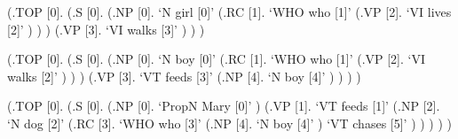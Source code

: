 \documentclass[10pt]{article}
\begin{document}
\begin{parsetree}  (.TOP [0]. (.S [0]. (.NP [0]. `N girl  [0]' (.RC [1]. `WHO who  [1]' (.VP [2]. `VI lives  [2]' ) ) ) (.VP [3]. `VI walks  [3]' ) ) ) \end{parsetree}

\begin{parsetree}  (.TOP [0]. (.S [0]. (.NP [0]. `N boy [0]' (.RC [1]. `WHO who [1]' (.VP [2]. `VI walks [2]' ) ) ) (.VP [3]. `VT feeds [3]' (.NP [4]. `N boy [4]' ) ) ) ) \end{parsetree}

\begin{parsetree}  (.TOP [0]. (.S [0]. (.NP [0]. `PropN Mary [0]' ) (.VP [1]. `VT feeds [1]' (.NP [2]. `N dog [2]' (.RC [3]. `WHO who [3]' (.NP [4]. `N boy [4]' ) `VT chases [5]' ) ) ) ) ) \end{parsetree}
\end{document}
